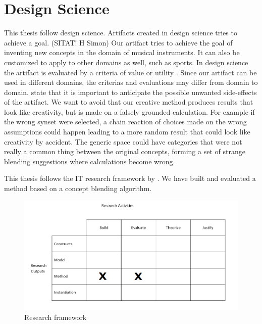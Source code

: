 \section{Design Science}
This thesis follow design science. Artifacts created in design science tries to achieve a goal. (SITAT! H Simon) Our artifact tries to achieve the goal of inventing new concepts in the domain of musical instruments. It can also be customized to apply to other domains as well, such as sports. In design science the artifact is evaluated by a criteria of value or utility \parencite{march1995design}. Since our artifact can be used in different domains, the criterias and evaluations may differ from domain to domain. \citet{march1995design} state that it is important to anticipate the possible unwanted side-effects of the artifact. We want to avoid that our creative method produces results that look like creativity, but is made on a falsely grounded calculation. For example if the wrong synset were selected, a chain reaction of choices made on the wrong assumptions could happen leading to a more random result that could look like creativity by accident. The generic space could  have categories that were not really a common thing between the original concepts, forming a set of strange blending suggestions where calculations become wrong.

This thesis follows the IT research framework by \citet{march1995design}. We have built and evaluated a method based on a concept blending algorithm.

\begin{figure}
\centering
\includegraphics[width=1\linewidth]{"Figures/design science figur"}
\caption{Research framework \parencite{march1995designfigure}}
\label{fig:design-science-figur}
\end{figure}



